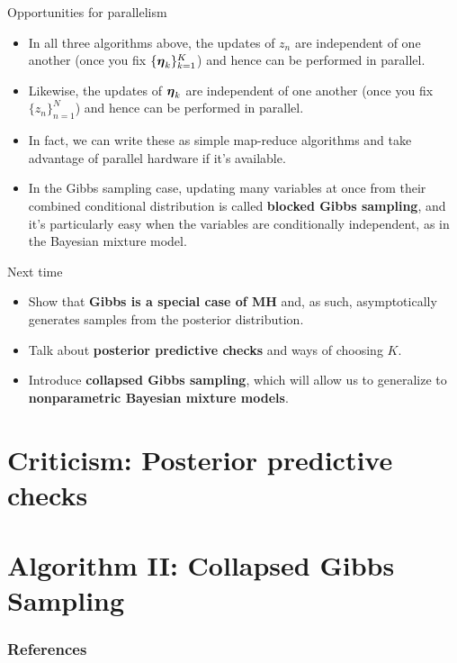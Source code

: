 \documentclass[aspectratio=169]{beamer}
\begin{document}
\begin{frame}{Opportunities for parallelism}
    
\begin{itemize}
    \item In all three algorithms above, the updates of $z_n$ are independent of one another (once you fix $\{\boldsymbol{\eta}_k\}_{k=1}^K$) and hence can be performed in parallel.
    
    \item Likewise, the updates of $\boldsymbol{\eta}_k$ are independent of one another (once you fix $\{z_n\}_{n=1}^N$) and hence can be performed in parallel.
    
    \item In fact, we can write these as simple map-reduce algorithms and take advantage of parallel hardware if it's available.
    
    \item In the Gibbs sampling case, updating many variables at once from their combined conditional distribution is called \textbf{blocked Gibbs sampling}, and it's particularly easy when the variables are conditionally independent, as in the Bayesian mixture model.
\end{itemize}
\end{frame}

\begin{frame}{Next time}

\begin{itemize}
    \item Show that \textbf{Gibbs is a special case of MH} and, as such, asymptotically generates samples from the posterior distribution.
    
    \item Talk about \textbf{posterior predictive checks} and ways of choosing $K$.
    
    \item Introduce \textbf{collapsed Gibbs sampling}, which will allow us to generalize to \textbf{nonparametric Bayesian mixture models}.
\end{itemize}
    
\end{frame}

\section{Criticism: Posterior predictive checks}
\label{sec:ppcs}

\section{Algorithm II: Collapsed Gibbs Sampling}
\label{sec:collapsed_gibbs}

\begin{frame}[t,allowframebreaks]
        \frametitle{References}
        
        
\end{frame}
\end{document}

